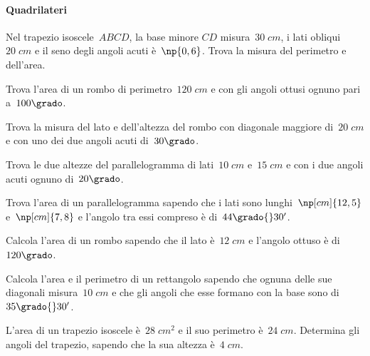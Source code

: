 \paragraph{Quadrilateri}
\begin{multicols}{2}
 \begin{esercizio}
\label{ese:G.26}
Nel trapezio isoscele~$ABCD$, la base minore $CD$ misura~$30\;\unit{cm}$, i lati obliqui~$20\;\unit{cm}$
e il seno degli angoli acuti è~$\np{0,6}$. Trova la misura del perimetro e dell'area.
\end{esercizio}

\begin{esercizio}
\label{ese:G.27}
Trova l'area di un rombo di perimetro~$120\;\unit{cm}$ e con gli angoli ottusi ognuno pari a~$100\grado$.
\end{esercizio}

\begin{esercizio}
\label{ese:G.28}
Trova la misura del lato e dell'altezza del rombo con diagonale maggiore di~$20\;\unit{cm}$ e con uno dei due angoli acuti di~$30\grado$.
\end{esercizio}

\begin{esercizio}
\label{ese:G.29}
Trova le due altezze del parallelogramma di lati~$10\;\unit{cm}$ e~$15\;\unit{cm}$ e con i due angoli acuti ognuno di~$20\grado$.
\end{esercizio}

\begin{esercizio}
\label{ese:G.30}
Trova l'area di un parallelogramma sapendo che i lati sono lunghi~$\np[cm]{12,5}$ e~$\np[cm]{7,8}$ e l'angolo tra essi compreso è di~$44\grado{}30'$.
\end{esercizio}

\begin{esercizio}
\label{ese:G.31}
Calcola l'area di un rombo sapendo che il lato è~$12\;\unit{cm}$ e l'angolo ottuso è di~$120\grado$.
\end{esercizio}

\begin{esercizio}
\label{ese:G.32}
Calcola l'area e il perimetro di un rettangolo sapendo che ognuna delle sue diagonali misura~$10\;\unit{cm}$
e che gli angoli che esse formano con la base sono di~$35\grado{}30'$.
\end{esercizio}

\begin{esercizio}
\label{ese:G.33}
L'area di un trapezio isoscele è~$28\;\unit{cm^2}$ e il suo perimetro è~$24\;\unit{cm}$. Determina gli angoli del trapezio,
sapendo che la sua altezza è~$4\;\unit{cm}$.
\end{esercizio}
\end{multicols}

